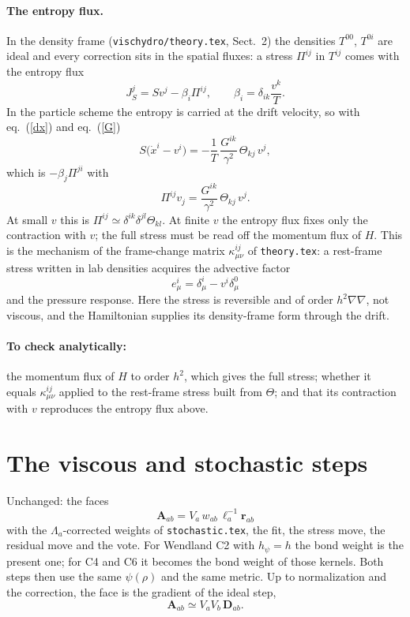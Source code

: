 \documentclass[11pt,aps,preprint,nofootinbib,superscriptaddress,tightenlines]{revtex4-2}
\def\st{\begin{equation}}
\def\stp{\end{equation}}
\def\Eq#1{eq.~(\ref{#1})}
\let\oldparagraph\paragraph
\renewcommand{\paragraph}{\par\bigskip\oldparagraph}
\begin{document}
\paragraph{The entropy flux.}  In the density frame (\texttt{vischydro/theory.tex}, Sect.~2) the densities $T^{00}$, $T^{0i}$ are ideal
and every correction sits in the spatial fluxes: a stress $\Pi^{ij}$ in $T^{ij}$ comes with the entropy flux
\st
J_S^j=Sv^j-\beta_i\Pi^{ij},\qquad \beta_i=\delta_{ik}\frac{v^k}{T} .
\stp
In the particle scheme the entropy is carried at the drift velocity, so with \Eq{dx} and \Eq{G}
\st
S\big(\dot x^i-v^i\big)=-\frac1T\,\frac{G^{ik}}{\gamma^2}\,\Theta_{kj}\,v^j ,
\stp
which is $-\beta_j\Pi^{ji}$ with
\st
\Pi^{ij}v_j=\frac{G^{ik}}{\gamma^2}\,\Theta_{kj}\,v^j .
\stp
At small $v$ this is $\Pi^{ij}\simeq\delta^{ik}\delta^{jl}\Theta_{kl}$.  At finite $v$ the entropy flux fixes only the contraction with $v$; the full
stress must be read off the momentum flux of $H$.  This is the mechanism of the frame-change matrix $\kappa^{ij}_{\mu\nu}$ of
\texttt{theory.tex}: a rest-frame stress written in lab densities acquires the advective factor
\st
e^i_\mu=\delta^i_\mu-v^i\delta^0_\mu
\stp
and the pressure response.  Here the stress is reversible and of order $h^2\nabla\nabla$, not viscous, and the Hamiltonian supplies its
density-frame form through the drift.

\paragraph{To check analytically:} the momentum flux of $H$ to order $h^2$, which gives the full stress; whether it equals
$\kappa^{ij}_{\mu\nu}$ applied to the rest-frame stress built from $\Theta$; and that its contraction with $v$ reproduces the entropy flux
above.

\section{The viscous and stochastic steps}
\label{sec:viscous}

Unchanged: the faces
\st
\bm A_{ab}=V_a\,w_{ab}\,\ell_a^{-1}\bm r_{ab}
\stp
with the $\Lambda_a$-corrected weights of \texttt{stochastic.tex}, the fit, the stress move, the residual move and the vote.  For Wendland
C2 with $h_\psi=h$ the bond weight is the present one; for C4 and C6 it becomes the bond weight of those kernels.  Both steps then use the
same $\psi(\rho)$ and the same metric.  Up to normalization and the correction, the face is the gradient of the ideal step,
\st
\bm A_{ab}\simeq V_aV_b\,\bm D_{ab} .
\stp
\end{document}

